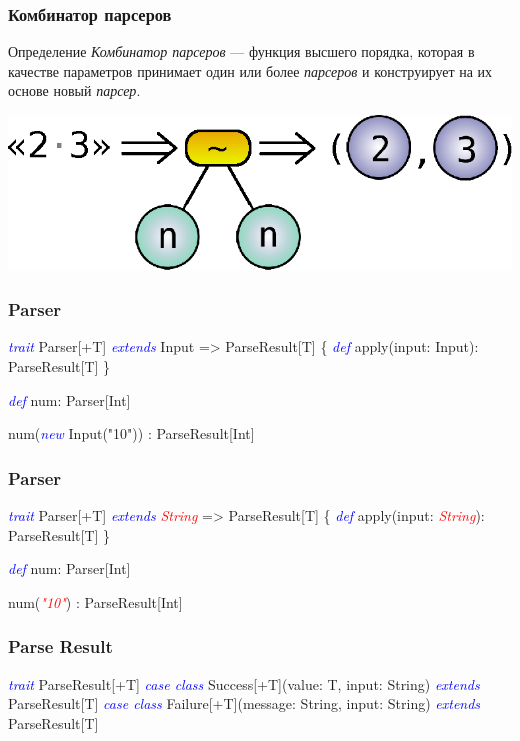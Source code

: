 \documentclass{beamer}
\newcommand{\keyword}[1]{\textcolor{blue}{\textsl{#1}}}
\newcommand{\replacement}[1]{\textcolor{red}{\textsl{#1}}}
\begin{document}
\begin{frame}
  \frametitle{Комбинатор парсеров}
  \begin{block}{Определение}
    \textit{Комбинатор парсеров} --- функция высшего порядка, которая
    в качестве параметров принимает один или более \textit{парсеров} и
    конструирует на их основе новый \textit{парсер}.
  \end{block}

  \pause

  \begin{center}
    \includegraphics{images/combinator-example.eps}
  \end{center}
\end{frame}

\begin{frame}[fragile]
  \frametitle{Parser}
  \begin{semiverbatim}
\keyword{trait} Parser[+T]\pause{} \keyword{extends} Input => ParseResult[T]\pause{} \{
  \keyword{def} apply(input: Input): ParseResult[T]
\}\pause

\keyword{def} num: Parser[Int]\pause

num(\keyword{new} Input("10")) : ParseResult[Int]
  \end{semiverbatim}
\end{frame}

\begin{frame}[fragile]
  \frametitle{Parser}
  \begin{semiverbatim}
\keyword{trait} Parser[+T] \keyword{extends} \replacement{String} => ParseResult[T] \{
  \keyword{def} apply(input: \replacement{String}): ParseResult[T]
\}

\keyword{def} num: Parser[Int]

num(\replacement{"10"}) : ParseResult[Int]
  \end{semiverbatim}
\end{frame}

\begin{frame}[fragile]
  \frametitle{Parse Result}
  \begin{semiverbatim}
\keyword{trait} ParseResult[+T]
\pause
\keyword{case class} Success[+T](value: T, input: String)
  \keyword{extends} ParseResult[T]
\pause
\keyword{case class} Failure[+T](message: String, input: String)
  \keyword{extends} ParseResult[T]
  \end{semiverbatim}
\end{frame}
\end{document}
